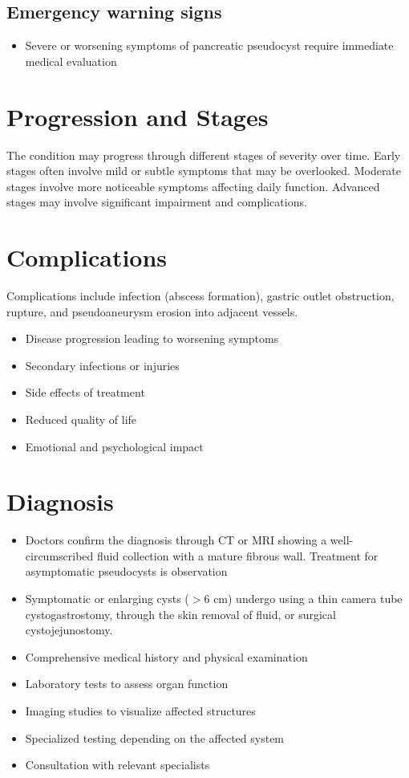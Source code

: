 \subsection{Emergency warning signs}
\begin{itemize}[noitemsep]
  \item Severe or worsening symptoms of pancreatic pseudocyst require immediate medical evaluation
\end{itemize}
\section{Progression and Stages}
The condition may progress through different stages of severity over time. Early stages often involve mild or subtle symptoms that may be overlooked. Moderate stages involve more noticeable symptoms affecting daily function. Advanced stages may involve significant impairment and complications.
\section{Complications}
Complications include infection (abscess formation), gastric outlet obstruction, rupture, and pseudoaneurysm erosion into adjacent vessels.

\begin{itemize}[noitemsep]
  \item Disease progression leading to worsening symptoms
  \item Secondary infections or injuries
  \item Side effects of treatment
  \item Reduced quality of life
  \item Emotional and psychological impact
\end{itemize}
\section{Diagnosis}
\begin{itemize}[noitemsep]
  \item Doctors confirm the diagnosis through CT or MRI showing a well-circumscribed fluid collection with a mature fibrous wall. Treatment for asymptomatic pseudocysts is observation
  \item Symptomatic or enlarging cysts ($>6$ cm) undergo using a thin camera tube cystogastrostomy, through the skin removal of fluid, or surgical cystojejunostomy.
  \item Comprehensive medical history and physical examination
  \item Laboratory tests to assess organ function
  \item Imaging studies to visualize affected structures
  \item Specialized testing depending on the affected system
  \item Consultation with relevant specialists
\end{itemize}
